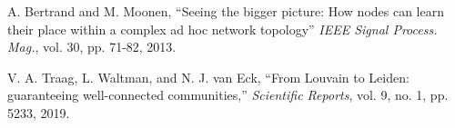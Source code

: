 \documentclass[12pt,twoside,a4paper,fleqn,bibliography=totocnumbered]{report}
\begin{document}

\setcounter{page}{1}
\cleardoublepage

\tableofcontents
\cleardoublepage
{}
\setcounter{page}{1}








\cleardoublepage
{}
%
%    	             

\begin{thebibliography}{1}

 A. Bertrand and M. Moonen, ``Seeing the bigger picture: How nodes can learn their place within a complex ad hoc network topology'' \emph{IEEE Signal Process. Mag.}, vol. 30, pp. 71-82, 2013.

 V. A. Traag, L. Waltman, and N. J. van Eck, ``From Louvain to Leiden: guaranteeing well-connected communities,'' \emph{Scientific Reports}, vol. 9, no. 1, pp. 5233, 2019.

\end{thebibliography}
\end{document}
